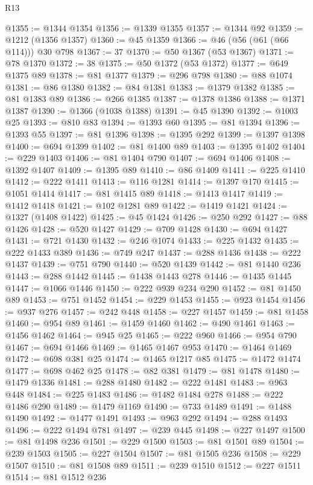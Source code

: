 \begin{lexlean}{R13}
\begin{coremodule}
@1355 := @1344 @1354
@1356 := @1339 @1355
@1357 := @1344 @92
@1359 := @1212 (@1356 @1357)
@1360 := @45 @1359
@1366 := @46 (@56 (@61 (@66 @114))) @30 @798
@1367 := 37
@1370 := @50 @1367 (@53 @1367)
@1371 := @78 @1370
@1372 := 38
@1375 := @50 @1372 (@53 @1372)
@1377 := @649 @1375 @89
@1378 := @81 @1377
@1379 := @296 @798
@1380 := @88 @1074
@1381 := @86 @1380
@1382 := @84 @1381
@1383 := @1379 @1382
@1385 := @81 @1383 @89
@1386 := @266 @1385
@1387 := @1378 @1386
@1388 := @1371 @1387
@1390 := @1366 (@1038 @1388)
@1391 := @45 @1390
@1392 := @1003 @25
@1393 := @810 @83
@1394 := @1393 @60
@1395 := @81 @1394
@1396 := @1393 @55
@1397 := @81 @1396
@1398 := @1395 @292
@1399 := @1397 @1398
@1400 := @694 @1399
@1402 := @81 @1400 @89
@1403 := @1395 @1402
@1404 := @229 @1403
@1406 := @81 @1404 @790
@1407 := @694 @1406
@1408 := @1392 @1407
@1409 := @1395 @89
@1410 := @86 @1409
@1411 := @225 @1410
@1412 := @222 @1411
@1413 := @116 @1281
@1414 := @1397 @170
@1415 := @1051 @1414
@1417 := @81 @1415 @89
@1418 := @1413 @1417
@1419 := @1412 @1418
@1421 := @102 @1281 @89
@1422 := @1419 @1421
@1424 := @1327 (@1408 @1422)
@1425 := @45 @1424
@1426 := @250 @292
@1427 := @88 @1426
@1428 := @520 @1427
@1429 := @709 @1428
@1430 := @694 @1427
@1431 := @721 @1430
@1432 := @246 @1074
@1433 := @225 @1432
@1435 := @222 @1433 @389
@1436 := @749 @247
@1437 := @288 @1436
@1438 := @222 @1437
@1439 := @751 @790
@1440 := @520 @1439
@1442 := @81 @1440 @236
@1443 := @288 @1442
@1445 := @1438 @1443 @278
@1446 := @1435 @1445
@1447 := @1066 @1446
@1450 := @222 @939 @234 @290
@1452 := @81 @1450 @89
@1453 := @751 @1452
@1454 := @229 @1453
@1455 := @923 @1454
@1456 := @937 @276
@1457 := @242 @448
@1458 := @227 @1457
@1459 := @81 @1458
@1460 := @954 @89
@1461 := @1459 @1460
@1462 := @490 @1461
@1463 := @1456 @1462
@1464 := @945 @25
@1465 := @222 @960
@1466 := @954 @790
@1467 := @694 @1466
@1469 := @1465 @1467 @953
@1470 := @1464 @1469
@1472 := @698 @381 @25
@1474 := @1465 @1217 @85
@1475 := @1472 @1474
@1477 := @698 @462 @25
@1478 := @82 @381
@1479 := @81 @1478
@1480 := @1479 @1336
@1481 := @288 @1480
@1482 := @222 @1481
@1483 := @963 @448
@1484 := @225 @1483
@1486 := @1482 @1484 @278
@1488 := @222 @1486 @290
@1489 := @1479 @1169
@1490 := @733 @1489
@1491 := @1488 @1490
@1492 := @1477 @1491
@1493 := @963 @292
@1494 := @288 @1493
@1496 := @222 @1494 @781
@1497 := @239 @445
@1498 := @227 @1497
@1500 := @81 @1498 @236
@1501 := @229 @1500
@1503 := @81 @1501 @89
@1504 := @239 @1503
@1505 := @227 @1504
@1507 := @81 @1505 @236
@1508 := @229 @1507
@1510 := @81 @1508 @89
@1511 := @239 @1510
@1512 := @227 @1511
@1514 := @81 @1512 @236

\end{coremodule}
\end{lexlean}
